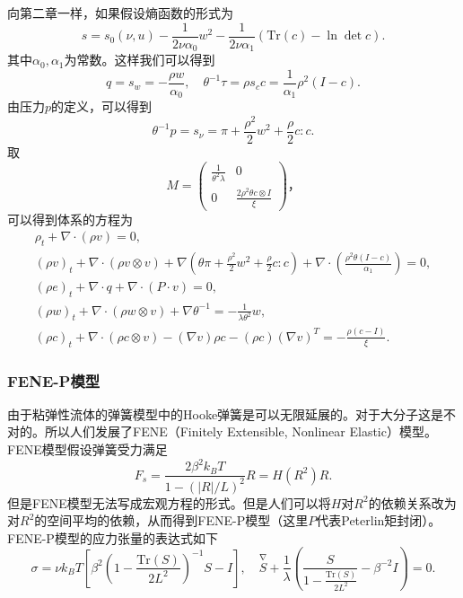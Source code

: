 \documentclass{article}
\begin{document}
	向第二章一样，如果假设熵函数的形式为
	\begin{equation*}
			s = s_0(\nu,u)  - \frac{1}{2 \nu \alpha_0} w^2 - \frac{1}{2 \nu \alpha_1} (\mbox{Tr}(c) - \ln \det c).
	\end{equation*}
	其中$\alpha_0,\alpha_1$为常数。这样我们可以得到
	\begin{equation*}
		q = s_w = -\frac{\rho w}{\alpha_0} ,\quad \theta^{-1} \tau = \rho s_c c = \frac{1}{\alpha_1} \rho^2  (I-c).
	\end{equation*}
	由压力$p$的定义，可以得到
	\begin{equation*}
		\theta^{-1} p = s_\nu = \pi +\frac{\rho^2}{2} w^2 + \frac{\rho}{2} c:c.
	\end{equation*}
	取\begin{equation*}
		M = \left( \begin{array}{ccc} 
			\frac{1}{\theta^2 \lambda} & 0 \\
			0 &  \frac{2 \rho^2 \theta c \otimes I}{\xi}   
		\end{array} \right)，
	\end{equation*}	
	可以得到体系的方程为
	\begin{subequations}
		\begin{align*}
			\rho_t + \nabla \cdot (\rho v) = 0 ,\\
			(\rho v)_t + \nabla \cdot (\rho v \otimes v) + \nabla (\theta \pi + \frac{\rho^2}{2} w^2 + \frac{\rho}{2} c:c)  + \nabla \cdot ( \frac{\rho^2 \theta(I-c)}{\alpha_1}) =0 ,\\
			(\rho e)_t + \nabla \cdot q + \nabla \cdot (P \cdot v) = 0, \\
			(\rho w)_t + \nabla \cdot (\rho w \otimes v) + \nabla \theta^{-1} = -\frac{1}{\lambda \theta^2} w, \\
			(\rho c)_t +  \nabla \cdot (\rho c \otimes v) - (\nabla v) \rho c - (\rho c) (\nabla v)^T  = -\frac{\rho (c-I) }{\xi}.
		\end{align*}
	\end{subequations}

	\subsubsection{FENE-P模型}
	由于粘弹性流体的弹簧模型中的Hooke弹簧是可以无限延展的。对于大分子这是不对的。所以人们发展了FENE（Finitely Extensible, Nonlinear Elastic）模型。FENE模型假设弹簧受力满足
	\begin{equation*}
		F_s = \frac{2 \beta^2 k_B T}{1-(|R|/L)^2} R = H(R^2)R.
	\end{equation*}
	但是FENE模型无法写成宏观方程的形式\cite{}。但是人们可以将$H$对$R^2$的依赖关系改为对$R^2$的空间平均的依赖，从而得到FENE-P模型（这里$P$代表Peterlin矩封闭\cite{}）。FENE-P模型的应力张量的表达式如下
	\begin{equation} \label{eq:FENEP}
		\sigma = \nu k_B T [ \beta^2 (1- \frac{\mbox{Tr}(S)}{2L^2})^{-1}S - I], \quad \stackrel{\nabla} S + \frac{1}{\lambda} (\frac{S}{1-\frac{\mbox{Tr}(S)}{2L^2}} - \beta^{-2}I) = 0. 
	\end{equation}
\end{document}
